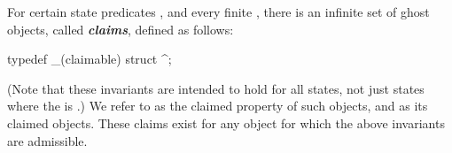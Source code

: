 \documentclass[preprint,nocopyrightspace]{sigplanconf}
\newcommand{\Def}[1]{\textit{\textbf{#1}}}
\begin{document}
{{{For certain state predicates , and every finite , 
there is an infinite set of ghost
objects, called \Def{claims}, defined as follows:
\begin{VCC}
  typedef _(claimable) struct  ^\claim;
\end{VCC}
(Note that these invariants are intended to hold for all states, not
just states where the \vcc{\claim} is \vcc{\closed}.)
We refer to  as the claimed property of such objects,
and  as its claimed objects. 
These claims exist for any object for which the above invariants
are admissible.

}}}
\end{document}
